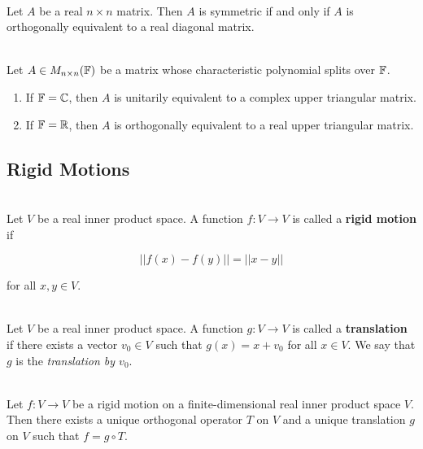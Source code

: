 \begin{theorem}
	\hfill\\
	Let $A$ be a real $n \times n$ matrix. Then $A$ is symmetric if and only if $A$ is orthogonally equivalent to a real diagonal matrix.
\end{theorem}

\begin{theorem}
	\hfill\\
	Let $A \in M_{n \times n}(\mathbb{F})$ be a matrix whose characteristic polynomial splits over $\mathbb{F}$.

	\begin{enumerate}
		\item If $\mathbb{F} = \mathbb{C}$, then $A$ is unitarily equivalent to a complex upper triangular matrix.
		\item If $\mathbb{F} = \mathbb{R}$, then $A$ is orthogonally equivalent to a real upper triangular matrix.
	\end{enumerate}
\end{theorem}

\subsection*{Rigid Motions}

\begin{definition}
	\hfill\\
	Let $V$ be a real inner product space. A function $f: V \to V$ is called a \textbf{rigid motion} if

	\[||f(x) - f(y)|| = ||x - y||\]

	for all $x,y \in V$.
\end{definition}

\begin{definition}
	\hfill\\
	Let $V$ be a real inner product space. A function $g: V \to V$ is called a \textbf{translation} if there exists a vector $v_0 \in V$ such that $g(x) = x + v_0$ for all $x \in V$. We say that $g$ is the \textit{translation by $v_0$}.
\end{definition}

\begin{theorem}
	\hfill\\
	Let $f: V \to V$ be a rigid motion on a finite-dimensional real inner product space $V$. Then there exists a unique orthogonal operator $T$ on $V$ and a unique translation $g$ on $V$ such that $f = g \circ T$.
\end{theorem}

